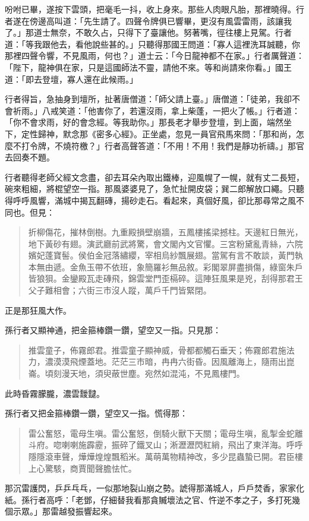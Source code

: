 吩咐已畢，遂按下雲頭，把毫毛一抖，收上身來。那些人肉眼凡胎，那裡曉得。行者遂在傍邊高叫道：「先生請了。四聲令牌俱已響畢，更沒有風雲雷雨，該讓我了。」那道士無奈，不敢久占，只得下了臺讓他。努著嘴，徑往樓上見駕。行者道：「等我跟他去，看他說些甚的。」只聽得那國王問道：「寡人這裡洗耳誠聽，你那裡四聲令響，不見風雨，何也？」道士云：「今日龍神都不在家。」行者厲聲道：「陛下，龍神俱在家，只是這國師法不靈，請他不來。等和尚請來你看。」國王道：「即去登壇，寡人還在此候雨。」

行者得旨，急抽身到壇所，扯著唐僧道：「師父請上臺。」唐僧道：「徒弟，我卻不會祈雨。」八戒笑道：「他害你了，若還沒雨，拿上柴蓬，一把火了帳。」行者道：「你不會求雨，好的會念經。等我助你。」那長老才舉步登壇，到上面，端然坐下，定性歸神，默念那《密多心經》。正坐處，忽見一員官飛馬來問：「那和尚，怎麼不打令牌，不燒符檄？」行者高聲答道：「不用！不用！我們是靜功祈禱。」那官去回奏不題。

行者聽得老師父經文念盡，卻去耳朵內取出鐵棒，迎風幌了一幌，就有丈二長短，碗來粗細，將棍望空一指。那風婆婆見了，急忙扯開皮袋；巽二郎解放口繩。只聽得呼呼風響，滿城中揭瓦翻磚，揚砂走石。看起來，真個好風，卻比那尋常之風不同也。但見：
\begin{quote}
折柳傷花，摧林倒樹。九重殿損壁崩牆，五鳳樓搖梁撼柱。天邊紅日無光，地下黃砂有翅。演武廳前武將驚，會文閣內文官懼。三宮粉黛亂青絲，六院嬪妃蓬寶髻。侯伯金冠落繡纓，宰相烏紗飄展翅。當駕有言不敢談，黃門執本無由遞。金魚玉帶不依班，象簡羅衫無品敘。彩閣翠屏盡損傷，綠窗朱戶皆狼狽。金鑾殿瓦走磚飛，錦雲堂門歪槅碎。這陣狂風果是兇，刮得那君王父子難相會；六街三市沒人蹤，萬戶千門皆緊閉。
\end{quote}

正是那狂風大作。

孫行者又顯神通，把金箍棒鑽一鑽，望空又一指。只見那：
\begin{quote}
推雲童子，佈霧郎君。推雲童子顯神威，骨都都觸石垂天；佈霧郎君施法力，濃漠漠飛煙蓋地。茫茫三市暗，冉冉六街昏。因風離海上，隨雨出崑崙。頃刻漫天地，須臾蔽世塵。宛然如混沌，不見鳳樓門。
\end{quote}

此時昏霧朦朧，濃雲靉靆。

孫行者又把金箍棒鑽一鑽，望空又一指。慌得那：
\begin{quote}
雷公奮怒，電母生嗔。雷公奮怒，倒騎火獸下天關；電母生嗔，亂掣金蛇離斗府。唿喇喇施霹靂，振碎了鐵叉山；淅瀝瀝閃紅綃，飛出了東洋海。呼呼隱隱滾車聲，燁燁煌煌飄稻米。萬萌萬物精神改，多少昆蟲蟄已開。君臣樓上心驚駭，商賈聞聲膽怯忙。
\end{quote}

那沉雷護閃，乒乒乓乓，一似那地裂山崩之勢。諕得那滿城人，戶戶焚香，家家化紙。孫行者高呼：「老鄧，仔細替我看那貪贓壞法之官、忤逆不孝之子，多打死幾個示眾。」那雷越發振響起來。

